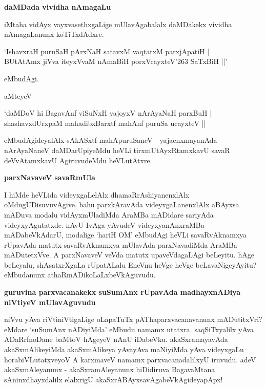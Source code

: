 {\bigskip
\noindent
{\large\bf daMDada vividha nAmagaLu}}\label{page100}
\medskip

\noindent
iMtaha vidAyx vayxvasethxgaLige mUlavAgabalalx daMDakekx vividha nAmagaLanunx koTiTxdAdxre.

\begin{shloka}
`IshavxraH puruSaH pArxNaH satavxM vaqtatxM parxjApatiH |\\\label{100}
BUtAtAmx jiVva iteyxVvaM nAmaBiH porxVcayxteV\char'263 SaTxBiH ||'
\end{shloka}

\noindent
eMbudAgi.

\newpage

\noindent
aMteyeV -

\begin{shloka}
`daMDoV hi BagavAnf viSuNxH yajoyxV nArAyaNaH parxBuH |\\\label{100}
shashavxdUrxpaM mahadibxBarxtf mahAnf puruSa ucayxteV ||
\end{shloka}

\noindent
eMbudAgideyalAlx sAkASxtf mahApuruSaneV - yajacnxmayanAda nArAyaNaneV daMDa\-rUpi\-yeMdu heVLi tirxmUtAyxRtamxkavU savaR deVvAtamxkavU AgiruvudeMdu heVLutAtxre.

{\bigskip
\noindent
{\large\bf parxNavaveV savaRmUla}}\label{page100}
\medskip

\noindent
I hiMde heVLida videyxgaLelAlx dhamaRrAshiyanenxlAlx oMdugUDisuvuvAgive. bahu parxkAravAda videyx\-gaLa\-nenxlAlx aBAyxsa mADuva modalu vidAyxmUladiMda AraMBa mADidare sariyAda videyxyAgu\-tatxde. nAvU IvAga yAvudeV videyxyanAnxraMBa mADabeVkAdarU, modalige `hariH OM' eMbudAgi heVLi savaRvAknamxya rUpavAda matutx savaRvAknamxya mUlavAda parxNavadiMda AraMBa mADutetxVve. A parxNavaveV veVda matutx upaveVdagaLAgi beLeyitu. hAge beLeyalu, shAsatxrXgaLa rUpatALalu EneVnu heVge heVge beLavaNigeyAyitu? eMbudanunx athaRmADikoLaLxbeVkAguvudu.

{\bigskip
\noindent
{\large\bf guruvina parxvacanakekx suSumAnx rUpavAda madhayxnADiya niVtiyeV mUlavAguvudu}}\label{page101}
\medskip

\noindent
niVvu yAva riVtiniVtigaLige oLapaTuTx pAThaparxvacanavanunx mADutitxVri? eMdare `suSumAnx nADi\-yiMda' eMbudu namamx utatxra. saqSiTxyalilx yAva ADaRrfnoDane baMtoV hAgeyeV nAnU iDa\-beVku. akaSxra\-mayavAda akaSxmAlikeyiMda akaSxmAlikeya yAvayAva maNiyiMda yAva videyxgaLu horabiVLu\-tatxveyoV A karxmaveV namamx parxvacanadalilxyU iruvudu. adeV akaSxmAleyanunx - akaSxra\-mAle\-yanunx hiDidiruva BagavaMtana sAninxdhayxdalilx elalxrigU akaSxrABAyxsavAgabeVkAgideyapApx!


